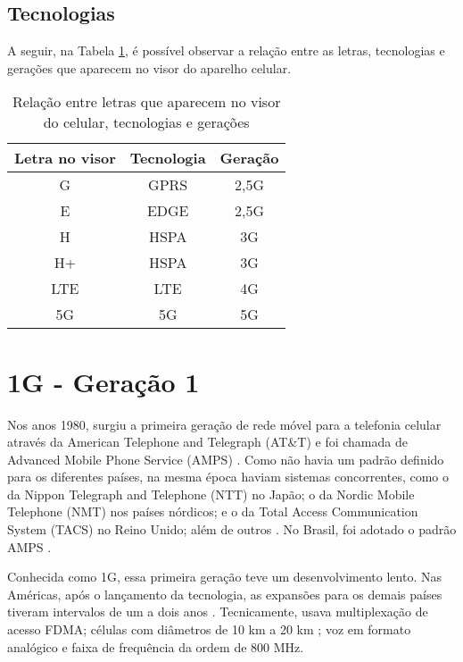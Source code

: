 \documentclass[11pt,oneside,a4paper]{abntex2}
\begin{document}
\subsection*{Tecnologias}

A seguir, na Tabela \ref{sopa-letrinhas-2}, é possível observar a relação entre as letras, tecnologias e gerações que aparecem no visor do aparelho celular.

\begin{table}
\caption{Relação entre letras que aparecem no visor do celular, tecnologias e gerações}
\label{sopa-letrinhas-2}
\begin{center}
\begin{tabular}{||c||c||c||}
	\hline
	\textbf{Letra no visor} & \textbf{Tecnologia} & \textbf{Geração} \\
	\hline
	\hline
	G & GPRS & 2,5G \\
	\hline
	E & EDGE & 2,5G \\
	\hline
	H & HSPA & 3G \\
	\hline
	H+ & HSPA & 3G \\
	\hline
	LTE & LTE & 4G \\
	\hline
	5G & 5G & 5G \\
	\hline
\end{tabular}
\end{center}
\end{table}

\section*{1G - Geração 1}
\label{1g}

Nos anos 1980, surgiu a primeira geração de rede móvel para a telefonia celular através da American Telephone and Telegraph (AT\&T) e foi chamada de Advanced Mobile Phone Service (AMPS) \cite{tcc1}. Como não havia um padrão definido para os diferentes países, na mesma época haviam sistemas concorrentes, como o da Nippon Telegraph and Telephone (NTT) no Japão; o da Nordic Mobile Telephone (NMT) nos países nórdicos; e o da Total Access Communication System (TACS) no Reino Unido; além de outros \cite{wiki-1g-br, wiki-1g-en}. No Brasil, foi adotado o padrão AMPS \cite{tcc2}.

Conhecida como 1G, essa primeira geração teve um desenvolvimento lento. Nas Américas, após o lançamento da tecnologia, as expansões para os demais países tiveram intervalos de um a dois anos \cite{repor1}. Tecnicamente, usava multiplexação de acesso FDMA; células com diâmetros de 10 km a 20 km \cite{aula3}; voz em formato analógico e faixa de frequência da ordem de 800 MHz.
\end{document}
